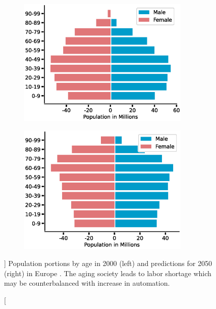 \begin{figure}[ht]
  \begin{subfigure}{0.5\textwidth}
    \centering
    \includegraphics[width=0.9\textwidth]{src/introduction/img/population_2000.eps}
  \end{subfigure}%
  \begin{subfigure}{0.5\textwidth}
    \centering
    \includegraphics[width=0.9\textwidth]{src/introduction/img/population_2050.eps}
  \end{subfigure}
  \caption
  []
  {
    Population portions by age in 2000 (left) and predictions for
    2050 (right) in Europe \footnotemark. The aging society leads to labor shortage
    which may be counterbalanced with increase in
    automation.
  }
  \label{fig:demographic_change}
\end{figure}

